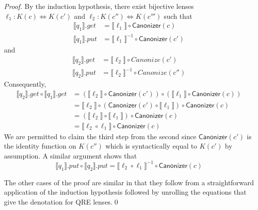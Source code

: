 \documentclass[acmsmall,review,anonymous]{acmart}
\newcommand{\kw}[1]{\ensuremath{\mathsf{#1}}}
\newcommand{\canonizer}{\ensuremath{\kw{Canonizer}}}
\begin{document}
\begin{proof}
By the induction hypothesis, there exist bijective lenses
$\ell_1 :
K(c) \Leftrightarrow K(c')$ and $\ell_2 : K(c'') \Leftrightarrow K(c''')$ such
that
\begin{align*}
\llbracket q_1 \rrbracket.get &= \llbracket \ell_1 \rrbracket \circ
\canonizer(c)\\
\llbracket q_1 \rrbracket.put &= {\llbracket \ell_1 \rrbracket}^{-1} \circ
\canonizer(c')
\end{align*}
and
\begin{align*}
\llbracket q_2 \rrbracket.get &= \llbracket \ell_2 \rrbracket \circ
Canonize(c')\\
\llbracket q_2 \rrbracket.put &= {\llbracket \ell_2 \rrbracket}^{-1} \circ
Canonize(c'')
\end{align*}
Consequently,
\begin{align*}
\llbracket q_2 \rrbracket.get \circ \llbracket q_1 \rrbracket.get &=
(\llbracket \ell_2 \rrbracket \circ \canonizer(c')) \circ (\llbracket \ell_1
\rrbracket \circ \canonizer(c))\\
&= \llbracket \ell_2 \rrbracket \circ (\canonizer(c') \circ \llbracket \ell_1
\rrbracket) \circ \canonizer(c)\\
&= (\llbracket \ell_2 \rrbracket \circ \llbracket \ell_1 \rrbracket) \circ
\canonizer(c)\\
&= \llbracket \ell_2  \circ  \ell_1 \rrbracket \circ
\canonizer(c)
\end{align*}
We are permitted to claim the third step from the second since
$\canonizer(c')$ is the identity function on $K(c'')$ which is
syntactically equal to $K(c')$ by assumption. A similar argument shows that
$$\llbracket q_1 \rrbracket.put \circ \llbracket q_2 \rrbracket.put =
\llbracket \ell_2  \circ  \ell_1 \rrbracket^{-1} \circ
\canonizer(c)$$

The other cases of the proof are similar in that they follow from a
straightforward application of the induction hypothesis followed by unrolling
the equations that give the denotation for QRE lenses.\qed
\end{proof}
\iffalse
\end{document}
